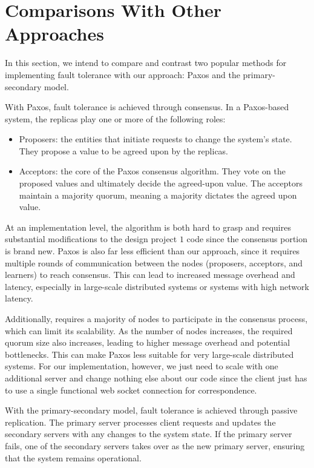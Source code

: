 \documentclass[
	a4paper, %
	10pt, %
	unnumberedsections, %
	twoside, %
]{LTJournalArticle}
\begin{document}
\section{Comparisons With Other Approaches}

In this section, we intend to compare and contrast two popular methods for implementing fault tolerance with our approach: Paxos and the primary-secondary model. 

With Paxos, fault tolerance is achieved through consensus. In a Paxos-based system, the replicas play one or more of the following roles:

\begin{itemize}
    \item Proposers: the entities that initiate requests to change the system's state. They propose a value to be agreed upon by the replicas. 
    \item Acceptors: the core of the Paxos consensus algorithm. They vote on the proposed values and ultimately decide the agreed-upon value. The acceptors maintain a majority quorum, meaning a majority dictates the agreed upon value. 
\end{itemize}

At an implementation level, the algorithm is both hard to grasp and requires substantial modifications to the design project $1$ code since the consensus portion is brand new. Paxos is also far less efficient than our approach, since it requires multiple rounds of communication between the nodes (proposers, acceptors, and learners) to reach consensus. This can lead to increased message overhead and latency, especially in large-scale distributed systems or systems with high network latency. 

Additionally, requires a majority of nodes to participate in the consensus process, which can limit its scalability. As the number of nodes increases, the required quorum size also increases, leading to higher message overhead and potential bottlenecks. This can make Paxos less suitable for very large-scale distributed systems. For our implementation, however, we just need to scale with one additional server and change nothing else about our code since the client just has to use a single functional web socket connection for correspondence. 

With the primary-secondary model, fault tolerance is achieved through passive replication. The primary server processes client requests and updates the secondary servers with any changes to the system state. If the primary server fails, one of the secondary servers takes over as the new primary server, ensuring that the system remains operational.
\end{document}
